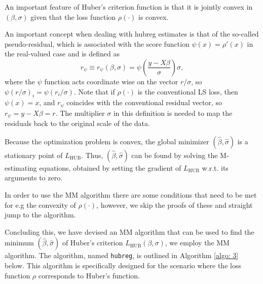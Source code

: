 An important feature of Huber’s criterion function is that it is jointly convex in $(\beta, \sigma)$ given that the loss function $\rho(\cdot)$ is convex. 

An important concept when dealing with hubreg estimates is that of the so-called pseudo-residual, which is associated with the score function $\psi(x) = \rho'(x)$ in the real-valued case and is defined as
\[
r_{\psi} \equiv r_{\psi}(\beta, \sigma) = \psi \left( \frac{y - X\beta}{\sigma} \right) \sigma,
\]
where the $\psi$ function acts coordinate wise on the vector $r/\sigma$, so $\psi(r/\sigma)_i = \psi(r_i/\sigma)$. Note that if $\rho(\cdot)$ is the conventional LS loss, then $\psi(x) = x$, and $r_{\psi}$ coincides with the conventional residual vector, so $r_{\psi} = y - X\beta = r$. The multiplier $\sigma$ in this definition is needed to map the residuals back to the original scale of the data.

Because the optimization problem is convex, the global minimizer $(\hat{\beta}, \hat{\sigma})$ is a stationary point of $L_{\text{HUB}}$. Thus, $(\hat{\beta}, \hat{\sigma})$ can be found by solving the M-estimating equations, obtained by setting the gradient of $L_{\text{HUB}}$ w.r.t. its arguments to zero. 

In order to use the MM algorithm there are some conditions that need to be met for e.g the convexity of $\rho(\cdot)$, however, we skip the proofs of these and straight jump to the algorithm. 

Concluding this, we have devised an MM algorithm that can be used to find the minimum $(\hat{\beta}, \hat{\sigma})$ of Huber’s criterion $L_{\text{HUB}}(\beta, \sigma)$, we employ the MM algorithm. The algorithm, named \texttt{hubreg}, is outlined in Algorithm \ref{algo: 3} below. This algorithm is specifically designed for the scenario where the loss function $\rho$ corresponds to Huber’s function.

